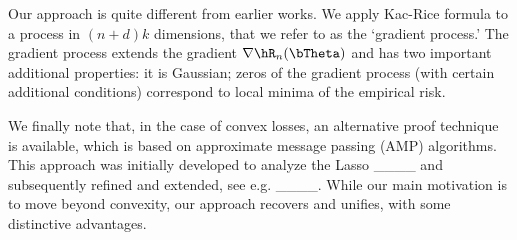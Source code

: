 Our approach is quite different from earlier works.
We apply Kac-Rice formula to a process in $(n+d)k$ dimensions,
that we refer to as the `gradient process.'
The gradient process extends the gradient $\nabla \hR_n(\bTheta)$ and has two important additional properties: it is Gaussian;
zeros of the gradient process (with certain additional conditions) correspond to local minima of the empirical risk.

We finally note that, in the case of convex losses, an alternative proof technique is available,
which is based on approximate message passing (AMP) algorithms. This approach was initially developed to
analyze the Lasso ____ and subsequently refined and extended, see e.g.
____.
While our main motivation is to move beyond convexity, our approach recovers and unifies,
with some distinctive advantages.